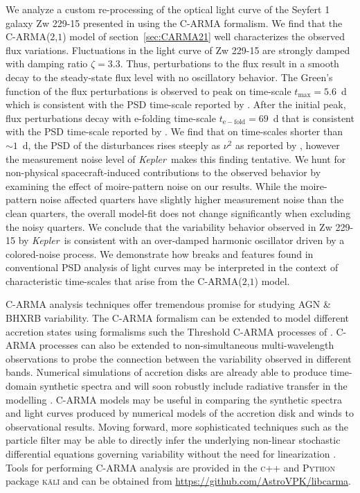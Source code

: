 \documentclass[a4paper,fleqn,usenatbib]{mnras}
\newcommand{\Kepler}{\textit{Kepler~}}
\begin{document}
We analyze a custom re-processing of the optical light curve of the Seyfert 1 galaxy Zw 229-15 presented in \citet{CariniWilliamsAAS} using the C-ARMA formalism. We find that the C-ARMA($2$,$1$) model of section~\ref{sec:CARMA21} well characterizes the observed flux variations. Fluctuations in the light curve of Zw 229-15 are strongly damped with damping ratio $\zeta = 3.3$. Thus, perturbations to the flux result in a smooth decay to the steady-state flux level with no oscillatory behavior. The Green's function of the flux perturbations is observed to peak on time-scale $t_{\mathrm{max}} = 5.6$~d which is consistent with the PSD time-scale reported by \citet{Edelson14}. After the initial peak, flux perturbations decay with e-folding time-scale $t_{\mathrm{e-fold}} = 69$~d that is consistent with the PSD time-scale reported by \citet{CariniWilliamsAAS}. We find that on time-scales shorter than $\sim 1$~d, the PSD of the disturbances rises steeply as $\nu^{2}$ as reported by \citet{Edelson14}, however the measurement noise level of \Kepler makes this finding tentative. We hunt for non-physical spacecraft-induced contributions to the observed behavior by examining the effect of moire-pattern noise on our results. While the moire-pattern noise affected quarters have slightly higher measurement noise than the clean quarters, the overall model-fit does not change significantly when excluding the noisy quarters. We conclude that the variability behavior observed in Zw 229-15 by \Kepler is consistent with an over-damped harmonic oscillator driven by a colored-noise process. We demonstrate how breaks and features found in conventional PSD analysis of light curves may be interpreted in the context of characteristic time-scales that arise from the C-ARMA($2$,$1$) model.

C-ARMA analysis techniques offer tremendous promise for studying AGN \& BHXRB variability. The C-ARMA formalism can be extended to model different accretion states using formalisms such the Threshold C-ARMA processes of \citet{DimensionEstimationBrockwell}. C-ARMA processes can also be extended to non-simultaneous multi-wavelength observations to probe the connection between the variability observed in different bands. Numerical simulations of accretion disks are already able to produce time-domain synthetic spectra \citep{Schnittman13b} and will soon robustly include radiative transfer in the modelling \citep{FragileAccretion}. C-ARMA models may be useful in comparing the synthetic spectra and light curves produced by numerical models of the accretion disk and winds to observational results. Moving forward, more sophisticated techniques such as the particle filter may be able to directly infer the underlying non-linear stochastic differential equations governing variability without the need for linearization \citep{Hanif15}. Tools for performing C-ARMA analysis are provided in the \textsc{c++} and \textsc{Python} package \textsc{k\={a}l\={i}} and can be obtained from \url{https://github.com/AstroVPK/libcarma}.
\end{document}
